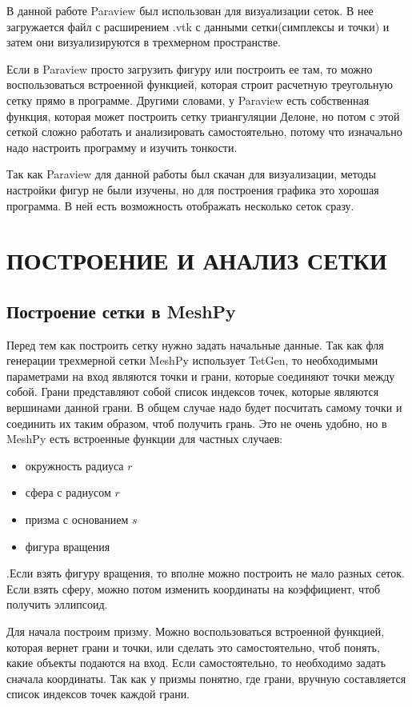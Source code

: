 В данной работе Paraview был использован для визуализации сеток. В нее загружается файл с расширением .vtk с данными сетки(симплексы и точки) и затем они визуализируются в трехмерном пространстве. 

Если в Paraview просто загрузить  фигуру или построить ее там, то можно воспользоваться встроенной функцией, которая строит расчетную треугольную сетку прямо в программе. Другими словами, у Paraview  есть собственная функция, которая может построить сетку триангуляции Делоне, но потом с этой сеткой сложно работать и анализировать самостоятельно, потому что изначально надо настроить программу и изучить тонкости. 

Так как Paraview для данной работы был скачан для визуализации, методы настройки фигур не были изучены, но для построения графика это хорошая программа. В ней есть возможность отображать несколько сеток сразу.


\chapter{ПОСТРОЕНИЕ И АНАЛИЗ СЕТКИ}
\section{Построение сетки в MeshPy}
Перед тем как построить сетку нужно задать начальные данные. Так как фля генерации трехмерной сетки MeshPy использует TetGen, то необходимыми параметрами на вход являются точки и грани, которые соединяют точки между собой. Грани представляют собой список индексов точек, которые являются вершинами данной грани.  В общем случае надо будет посчитать самому точки и соединить их таким образом, чтоб получить грань. Это не очень удобно, но в MeshPy есть встроенные функции для частных случаев:
\begin{itemize}
\item окружность радиуса $r$
    \item сфера с радиусом $r$
    \item призма с основанием $s$
    \item фигура вращения 
\end{itemize}
\cite{meshpy}.Если взять фигуру вращения, то вполне можно построить не мало разных сеток. Если взять сферу, можно потом изменить координаты на коэффициент, чтоб получить эллипсоид. 

Для начала построим призму. Можно воспользоваться встроенной функцией, которая вернет грани и точки, или сделать это самостоятельно, чтоб понять, какие объекты подаются на вход. Если самостоятельно, то необходимо задать сначала координаты. Так как у призмы понятно, где грани, вручную составляется список индексов точек каждой грани. 

